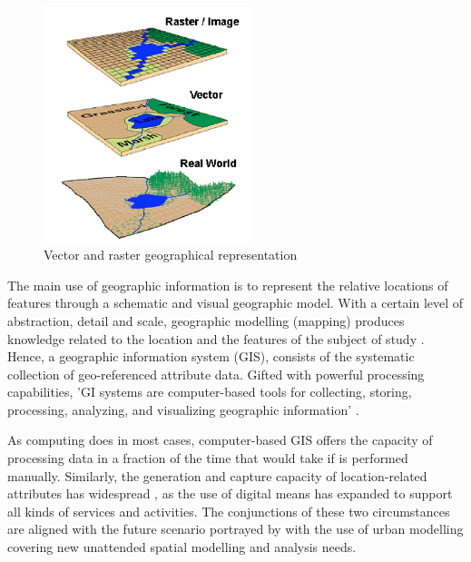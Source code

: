 \documentclass[12pt, a4paper]{report}
\begin{document}
\begin{figure}[htp]
    \centering
    \includegraphics[width=6cm]{Images/Fig_Types_Geodata.png}
    \caption{Vector and raster geographical representation \citep{saabConceptualizingSpaceMapping2003}}
    \label{fig:Fig_data_types}
\end{figure}



The main use of geographic information is to represent the relative locations of features through a schematic and visual geographic model. With a certain level of abstraction, detail and scale, geographic modelling (mapping) produces knowledge related to the location and the features of the subject of study \citep{longleyGeographicInformationScience2015}. Hence, a geographic information system (GIS), consists of the systematic collection of geo-referenced attribute data. Gifted with powerful processing capabilities, 'GI systems are computer-based tools for collecting, storing, processing, analyzing, and visualizing geographic information' \citep{longleyGeographicInformationScience2015}.






As computing does in most cases, computer-based GIS offers the capacity of processing data in a fraction of the time that would take if is performed manually. Similarly, the generation and capture capacity of location-related attributes has widespread \citep{longleyGeographicInformationScience2015}, as the use of digital means has expanded to support all kinds of services and activities. The conjunctions of these two circumstances are aligned with the future scenario portrayed by \cite{wilsonFutureUrbanModelling2018} with the use of urban modelling covering new unattended spatial modelling and analysis needs.
\end{document}
